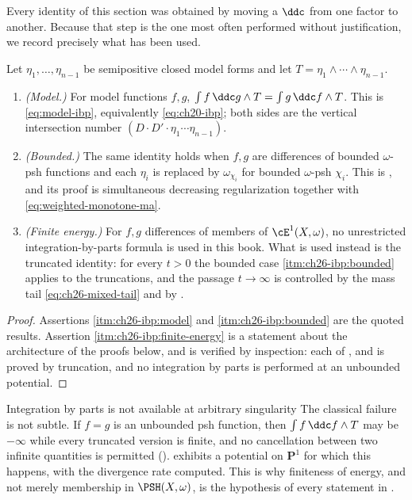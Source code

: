 Every identity of this section was obtained by moving a \(\ddc\) from one
factor to another.  Because that step is the one most often performed without
justification, we record precisely what has been used.

\begin{proposition}
\label{prop:ch26-ibp-regimes}
Let \(\eta_1,\ldots,\eta_{n-1}\) be semipositive closed model forms and let
\(T=\eta_1\wedge\cdots\wedge\eta_{n-1}\).
\begin{enumerate}
\item\label{itm:ch26-ibp:model}
 \emph{(Model.)}  For model functions \(f,g\),
 \(\int f\,\ddc g\wedge T=\int g\,\ddc f\wedge T\).  This is
 \eqref{eq:model-ibp}, equivalently \eqref{eq:ch20-ibp}; both sides are the
 vertical intersection number \((D\cdot D'\cdot\eta_1\cdots\eta_{n-1})\).
\item\label{itm:ch26-ibp:bounded}
 \emph{(Bounded.)}  The same identity holds when \(f,g\) are differences of
 bounded \(\omega\)-psh functions and each \(\eta_i\) is replaced by
 \(\omega_{\chi_i}\) for bounded \(\omega\)-psh \(\chi_i\).  This is
 , and its proof is simultaneous
 decreasing regularization together with
 \eqref{eq:weighted-monotone-ma}.
\item\label{itm:ch26-ibp:finite-energy}
 \emph{(Finite energy.)}  For \(f,g\) differences of members of
 \(\cE^1(X,\omega)\), no unrestricted integration-by-parts formula is used in
 this book.  What is used instead is the truncated identity: for every
 \(t>0\) the bounded case \cref{itm:ch26-ibp:bounded} applies to the
 truncations, and the passage \(t\to\infty\) is controlled by the mass tail
 \eqref{eq:ch26-mixed-tail} and by .
\end{enumerate}
\end{proposition}

\begin{proof}
Assertions \cref{itm:ch26-ibp:model} and \cref{itm:ch26-ibp:bounded} are the
quoted results.  Assertion \cref{itm:ch26-ibp:finite-energy} is a statement
about the architecture of the proofs below, and is verified by inspection:
each of ,
 and
 is proved by truncation, and no
integration by parts is performed at an unbounded potential.
\end{proof}

\begin{warning}{Integration by parts is not available at arbitrary
singularity}
The classical failure is not subtle.  If \(f=g\) is an unbounded psh
function, then \(\int f\,\ddc f\wedge T\) may be \(-\infty\) while every
truncated version is finite, and no cancellation between two infinite
quantities is permitted
().  
exhibits a potential on \(\mathbf P^1\) for which this happens, with the
divergence rate computed.  This is why finiteness of energy, and not merely
membership in \(\PSH(X,\omega)\), is the hypothesis of every statement in
.
\end{warning}

